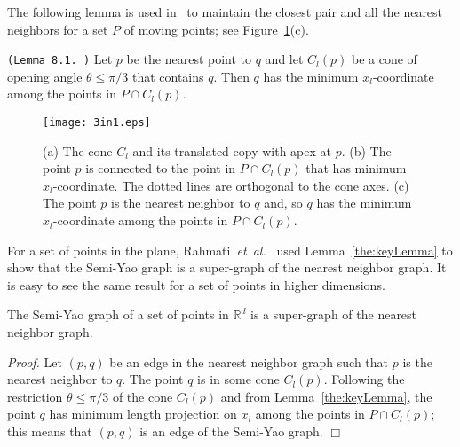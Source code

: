 \documentclass[11pt]{llncs}
\newcommand{\etal}{\emph{et~al.}}
\renewenvironment{proof}{\emph{Proof.}}{\hfill $\Box$ \medskip\\}
\begin{document}
The following lemma is used in~\cite{Basch:1997:DSM:314161.314435,Agarwal:2008:KDD:1435375.1435379,socg17-rahmati} to maintain the closest pair and all the nearest neighbors for a set $P$ of moving points; see Figure~\ref{fig:SY6}(c).
\begin{lemma}{\tt (Lemma 8.1.~\cite{Agarwal:2008:KDD:1435375.1435379})}\label{the:keyLemma}
Let $p$ be the nearest point to $q$ and let $C_l(p)$ be a cone of opening angle $\theta\leq \pi/3$ that contains $q$. Then $q$ has the minimum $x_l$-coordinate among the points in $P\cap C_l(p)$.
\end{lemma}
\begin{figure}[t]
\centering
\texttt{[image: 3in1.eps]}
\vspace{-5pt}
\caption{\small (a) The cone $C_l$ and its translated copy with apex at $p$. (b) The point $p$ is connected to the point in $P\cap C_l(p)$ that has minimum $x_l$-coordinate. The dotted lines are orthogonal to the cone axes. (c) The point $p$ is the nearest neighbor to $q$ and, so $q$ has the minimum $x_l$-coordinate among the points in $P\cap C_l(p)$.}
\vspace{-12pt}
\label{fig:SY6}
\end{figure}
For a set of points in the plane, Rahmati~\etal~\cite{socg17-rahmati} used Lemma~\ref{the:keyLemma} to show that the Semi-Yao graph is a super-graph of the nearest neighbor graph. It is easy to see the same result for a set of points in higher dimensions.
\begin{lemma}\label{the:SYcontainsNNG}
The Semi-Yao graph of a set of points in $\mathbb{R}^d$ is a super-graph of the nearest neighbor graph.
\end{lemma}
\begin{proof}
Let $(p,q)$ be an edge in the nearest neighbor graph such that $p$ is the nearest neighbor to $q$. The point $q$ is in some cone $C_l(p)$. Following the restriction $\theta\leq \pi/3$ of the cone $C_l(p)$ and from Lemma~\ref{the:keyLemma}, the point $q$ has minimum length projection on $x_l$ among the points in $P\cap C_l(p)$; this means that $(p,q)$ is an edge of the Semi-Yao graph.
\end{proof}
\end{document}
